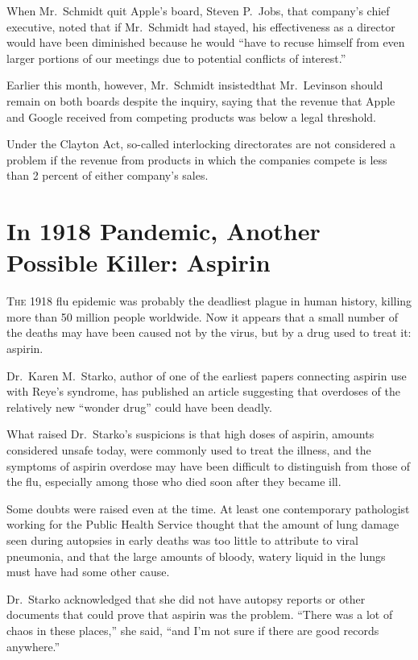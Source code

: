 ﻿\documentclass[12pt]{article}
\begin{document}
When Mr.~Schmidt quit Apple's board, Steven P.~Jobs, that company's chief executive, noted that if
Mr.~Schmidt had stayed, his effectiveness as a director would have been diminished because he would
``have to recuse himself from even larger portions of our meetings due to potential conflicts of
interest.''

Earlier this month, however, Mr.~Schmidt insistedthat Mr.~Levinson should remain on both boards
despite the inquiry, saying that the revenue that Apple and Google received from competing products
was below a legal threshold.

Under the Clayton Act, so-called interlocking directorates are not considered a problem if the
revenue from products in which the companies compete is less than 2 percent of either company's
sales.

\section{In 1918 Pandemic\cite{pandemic}, Another Possible Killer: Aspirin}

\lettrine{T}{he} 1918 flu epidemic was probably the deadliest plague in
human history, killing more than 50 million people worldwide. Now it appears that a small number of
the deaths may have been caused not by the virus, but by a drug used to treat it: aspirin.

Dr.~Karen M.~Starko, author of one of the earliest papers connecting aspirin use with Reye's
syndrome, has published an article suggesting that overdoses of the relatively new ``wonder drug''
could have been deadly.

What raised Dr.~Starko's suspicions is that high doses of aspirin, amounts considered unsafe today,
were commonly used to treat the illness, and the symptoms of aspirin overdose may have been
difficult to distinguish from those of the flu, especially among those who died soon after they
became ill.

Some doubts were raised even at the time. At least one contemporary pathologist working for the
Public Health Service thought that the amount of lung damage seen during autopsies in early deaths
was too little to attribute to viral pneumonia, and that the large amounts of bloody, watery liquid
in the lungs must have had some other cause.

Dr.~Starko acknowledged that she did not have autopsy reports or other documents that could prove
that aspirin was the problem. ``There was a lot of chaos in these places,'' she said, ``and I'm not
sure if there are good records anywhere.''
\end{document}
